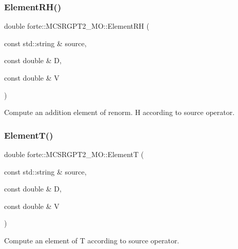 \mbox{\label{classforte_1_1_m_c_s_r_g_p_t2___m_o_aff400e48ffc929eeb61bbe1e32407707}} 
\subsubsection{\texorpdfstring{Element\+R\+H()}{ElementRH()}}
{\footnotesize\ttfamily double forte\+::\+M\+C\+S\+R\+G\+P\+T2\+\_\+\+M\+O\+::\+Element\+RH (\begin{DoxyParamCaption}\item[{const std\+::string \&}]{source,  }\item[{const double \&}]{D,  }\item[{const double \&}]{V }\end{DoxyParamCaption})\hspace{0.3cm}{\ttfamily [protected]}}



Compute an addition element of renorm. H according to source operator. 

\mbox{\label{classforte_1_1_m_c_s_r_g_p_t2___m_o_a9668e316f94c15c688146a7e2d20893c}} 
\subsubsection{\texorpdfstring{Element\+T()}{ElementT()}}
{\footnotesize\ttfamily double forte\+::\+M\+C\+S\+R\+G\+P\+T2\+\_\+\+M\+O\+::\+ElementT (\begin{DoxyParamCaption}\item[{const std\+::string \&}]{source,  }\item[{const double \&}]{D,  }\item[{const double \&}]{V }\end{DoxyParamCaption})\hspace{0.3cm}{\ttfamily [protected]}}



Compute an element of T according to source operator. 

